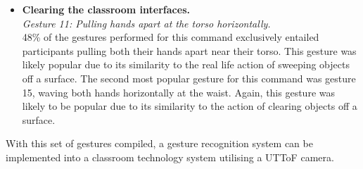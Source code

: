 \documentclass[manuscript, review, screen]{acmart}
\begin{document}
\begin{itemize}
\item \textbf{Clearing the classroom interfaces.}\\
\textit{Gesture 11: Pulling hands apart at the torso horizontally.}\\
48\% of the gestures performed for this command exclusively entailed participants pulling both their hands apart near their torso.
This gesture was likely popular due to its similarity to the real life action of sweeping objects off a surface.
The second most popular gesture for this command was gesture 15, waving both hands horizontally at the waist.
Again, this gesture was likely to be popular due to its similarity to the action of clearing objects off a surface.\\
\end{itemize}

With this set of gestures compiled, a gesture recognition system can be implemented into a classroom technology system utilising a \ac{UTToF} camera.





\end{document}

